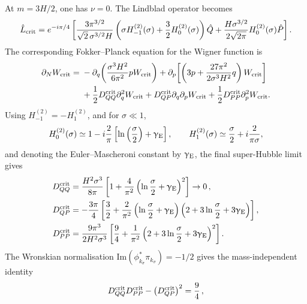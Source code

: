 \documentclass{article}
\numberwithin{equation}{section}
\begin{document}
	At \(m=3H/2\), one has \(\nu=0\). The Lindblad operator becomes
	\begin{equation}
		\hat L_{\rm crit}=e^{-i\pi/4}\left[\frac{3\pi^{3/2}}{\sqrt2\,\sigma^{3/2}H} \left(\sigma H_{-1}^{(2)}(\sigma)+\frac32H_0^{(2)}(\sigma)\right)\hat Q +\frac{H\sigma^{3/2}}{2\sqrt{2\pi}}H_0^{(2)}(\sigma)\hat P\right].
	\end{equation}
	The corresponding Fokker--Planck equation for the Wigner function is
	\begin{align}
		\partial_N W_{\rm crit}
		={}&
		-\partial_q\!\left(
		\frac{\sigma^3H^2}{6\pi^2}pW_{\rm crit}
		\right)
		+
		\partial_p\!\left[
		\left(
		3p+\frac{27\pi^2}{2\sigma^3H^2}q
		\right)W_{\rm crit}
		\right]
		\nonumber
		\\
		&+\frac12D^{\rm crit}_{QQ}\partial_q^2W_{\rm crit}
		+D^{\rm crit}_{QP}\partial_q\partial_pW_{\rm crit}
		+\frac12D^{\rm crit}_{PP}\partial_p^2W_{\rm crit}.
		\label{eq:FPCritMain}
	\end{align}
	Using \(H_{-1}^{(2)}=-H_1^{(2)}\), and for \(\sigma\ll1\),
	\begin{equation}
		H_0^{(2)}(\sigma)\simeq 1-i\frac{2}{\pi}\left[\ln\left(\frac{\sigma}{2}\right)+\upgamma_{\rm E}\right], \qquad H_1^{(2)}(\sigma)\simeq \frac{\sigma}{2}+i\frac{2}{\pi\sigma},
	\end{equation}
	and denoting the Euler--Mascheroni constant by \(\upgamma_{\rm E}\), the final super-Hubble limit gives
	\begin{align}
		D_{QQ}^{\rm crit}
		&=
		\frac{H^2\sigma^3}{8\pi}
		\left[
		1+\frac{4}{\pi^2}
		\left(\ln\frac{\sigma}{2}+\upgamma_{\rm E}\right)^2
		\right]
		\to 0\, ,
		\label{eq:DQQcrit}
		\\
		D_{QP}^{\rm crit}
		&=
		-\frac{3\pi}{4}
		\left[
		\frac32
		+\frac{2}{\pi^2}
		\left(\ln\frac{\sigma}{2}+\upgamma_{\rm E}\right)
		\left(2+3\ln\frac{\sigma}{2}+3\upgamma_{\rm E}\right)
		\right],
        \label{eq:DQPcrit}
		\\
		D_{PP}^{\rm crit}
		&=
		\frac{9\pi^3}{2H^2\sigma^3}
		\left[
		\frac94
		+\frac{1}{\pi^2}
		\left(2+3\ln\frac{\sigma}{2}+3\upgamma_{\rm E}\right)^2
		\right].
		\label{eq:CriticalDiffusionSuperHubbleMain}
	\end{align}
	The Wronskian normalisation $\mathrm{Im}(\phi^*_{k_\sigma}\pi_{k_\sigma})=-1/2$ gives the mass-independent identity
	\begin{equation}
		D_{QQ}^{\rm crit}D_{PP}^{\rm crit}
		-\left(D_{QP}^{\rm crit}\right)^2
		=
		\frac94\, ,
		\label{eq:CriticalDiffusionInvariantMain}
	\end{equation}
\end{document}
